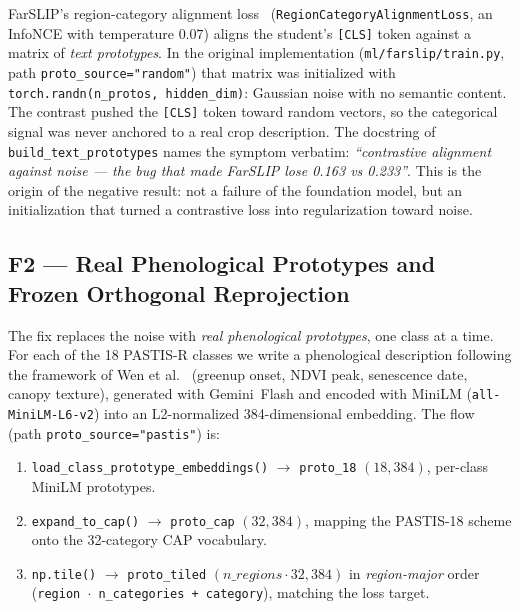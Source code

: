 FarSLIP's region-category alignment loss~\cite{li2025farslip}
(\texttt{RegionCategoryAlignmentLoss}, an InfoNCE with temperature $0.07$) aligns
the student's \texttt{[CLS]} token against a matrix of \textit{text prototypes}.
In the original implementation (\texttt{ml/farslip/train.py}, path
\texttt{proto\_source="random"}) that matrix was initialized with
\texttt{torch.randn(n\_protos, hidden\_dim)}: Gaussian noise with no semantic
content. The contrast pushed the \texttt{[CLS]} token toward random vectors, so
the categorical signal was never anchored to a real crop description. The
docstring of \texttt{build\_text\_prototypes} names the symptom verbatim:
\textit{``contrastive alignment against noise --- the bug that made FarSLIP lose
0.163 vs 0.233''}. This is the origin of the negative result: not a failure of
the foundation model, but an initialization that turned a contrastive loss into
regularization toward noise.

\subsection{F2 --- Real Phenological Prototypes and Frozen Orthogonal Reprojection}
\label{sec:farslip_f2}

The fix replaces the noise with \textit{real phenological prototypes}, one class
at a time. For each of the 18 PASTIS-R classes we write a phenological
description following the framework of Wen et al.~\cite{wen2025phenology}
(greenup onset, NDVI peak, senescence date, canopy texture), generated with
Gemini~Flash and encoded with MiniLM (\texttt{all-MiniLM-L6-v2}) into an
L2-normalized 384-dimensional embedding. The flow (path
\texttt{proto\_source="pastis"}) is:

\begin{enumerate}[leftmargin=*]
    \item \texttt{load\_class\_prototype\_embeddings()} $\rightarrow$
    \texttt{proto\_18} $(18, 384)$, per-class MiniLM prototypes.
    \item \texttt{expand\_to\_cap()} $\rightarrow$ \texttt{proto\_cap}
    $(32, 384)$, mapping the PASTIS-18 scheme onto the 32-category CAP
    vocabulary.
    \item \texttt{np.tile()} $\rightarrow$ \texttt{proto\_tiled}
    $(n\_regions \cdot 32, 384)$ in \textit{region-major} order
    (\texttt{region $\cdot$ n\_categories + category}), matching the loss
    target.
\end{enumerate}

